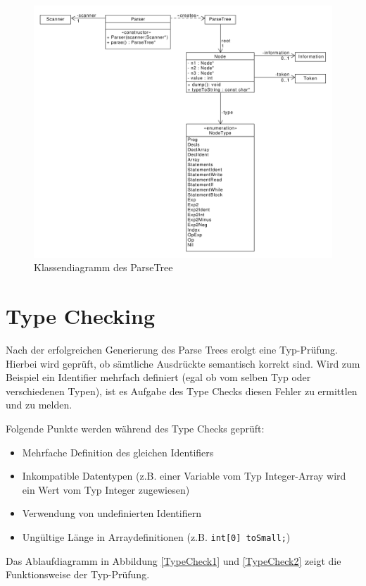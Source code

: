 \documentclass[
a4paper
]{scrreprt}
\begin{document}
\begin{figure}[htbp]
\centering
\includegraphics[width=\textwidth]{./diagramms/parser.pdf}
\caption{Klassendiagramm des ParseTree}
\label{parseTree}
\end{figure}


\section{Type Checking}
Nach der erfolgreichen Generierung des Parse Trees erolgt eine Typ-Prüfung. Hierbei wird geprüft, ob sämtliche Ausdrückte semantisch korrekt sind. Wird zum Beispiel ein Identifier mehrfach definiert (egal ob vom selben Typ oder verschiedenen Typen), ist es Aufgabe des Type Checks diesen Fehler zu ermittlen und zu melden.

Folgende Punkte werden während des Type Checks geprüft:
\begin{itemize}
\item Mehrfache Definition des gleichen Identifiers
\item Inkompatible Datentypen (z.B. einer Variable vom Typ Integer-Array wird ein Wert vom Typ Integer zugewiesen)
\item Verwendung von undefinierten Identifiern
\item Ungültige Länge in Arraydefinitionen (z.B. \lstinline{int[0] toSmall;})
\end{itemize}

Das Ablaufdiagramm in Abbildung \ref{TypeCheck1} und \ref{TypeCheck2} zeigt die Funktionsweise der Typ-Prüfung.
\end{document}
